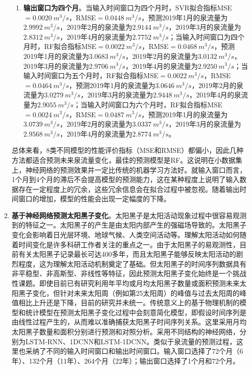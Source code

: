 \begin{enumerate}
\begin{enumerate}
      \item \textbf{输出窗口为四个月}。当输入时间窗口为四个月时，SVR拟合指标MSE$=\SI{0.0020}{m^{3}/s}$，RMSE$=\SI{0.0448}{m^{3}/s}$，预测2019年1月的泉流量为$\SI{2.9992}{m^{3}/s}$，2019年2月的泉流量为$\SI{2.9144}{m^{3}/s}$，2019年3月的泉流量为$\SI{2.8312}{m^{3}/s}$，2019年4月的泉流量为$\SI{2.7752}{m^{3}/s}$；当输入时间窗口为四个月时，RF拟合指标MSE$=\SI{0.0022}{m^{3}/s}$，RMSE$=\SI{0.0468}{m^{3}/s}$，预测2019年1月的泉流量为$\SI{3.0683}{m^{3}/s}$，2019年2月的泉流量为$\SI{3.0132}{m^{3}/s}$，2019年3月的泉流量为$\SI{2.9706}{m^{3}/s}$，2019年4月的泉流量为$\SI{2.9250}{m^{3}/s}$；当输入时间窗口为五个月时，RF拟合指标MSE$=\SI{0.0022}{m^{3}/s}$，RMSE$=\SI{0.0464}{m^{3}/s}$，预测2019年1月的泉流量为$\SI{3.0646}{m^{3}/s}$，2019年2月的泉流量为$\SI{3.0279}{m^{3}/s}$，2019年3月的泉流量为$\SI{2.9448}{m^{3}/s}$，2019年4月的泉流量为$\SI{2.9055}{m^{3}/s}$；当输入时间窗口为六个月时，RF拟合指标MSE$=\SI{0.0024}{m^{3}/s}$，RMSE$=\SI{0.0487}{m^{3}/s}$，预测2019年1月的泉流量为$\SI{3.0739}{m^{3}/s}$，2019年2月的泉流量为$\SI{3.0337}{m^{3}/s}$，2019年3月的泉流量为$\SI{2.9568}{m^{3}/s}$，2019年4月的泉流量为$\SI{2.8774}{m^{3}/s}$。
    \end{enumerate}
  
    总体来看，8类不同模型的性能评价指标（MSE和RMSE）都偏小，因此几种方法都适合预测未来泉流量变化，最佳的预测模型是RF。这说明在小数据集上，神经网络的预测效果并一定比传统的机器学习方法好。就输入窗口而言，1个月到4个月的滞后不会提高模型的预测能力，这在某种程度上说明了输入数据存在一定程度上的冗余，这些冗余信息会在拟合过程中被忽视。随着输出时间窗口的增加，模型的性能会出现一定幅度的下降。
  
  
    \item \textbf{基于神经网络预测太阳黑子变化}。太阳黑子是太阳活动现象过程中很容易观测到的特征之一。太阳黑子的产生是由太阳内部产生的强磁场导致的。太阳黑子变化会影响着日光层环境、地球气候、人类空间活动等。理解太阳活动如何随着时间变化是许多科研工作者关注的重点之一。由于太阳黑子的易观测性，目前有关太阳黑子记录最长可达400多年，而且太阳黑子能够反映太阳活动的剧烈程度，这为理解太阳活动机制奠定了基础。但太阳黑子的时间序列数据具有非平稳型、非高斯型、非线性等特征，因此预测太阳黑子变化始终是一个挑战性课题。即使目前已有研究利用年平均或月均太阳黑子数量或面积预测未来太阳黑子变化，但针对未来太阳周（例如第25太阳周）的峰值与过去太阳周的峰值相比上升还是下降，目前的研究并未统一。传统意义上的基于物理机制的模型和统计模型在预测太阳黑子变化过程中会刻意简化模型，即假设时间序列是由线性过程产生的，从而难以准确捕获太阳黑子时间序列关系。这里采用月均太阳黑子数量和面积分别进行预测和对照分析。采用不同结构的神经网络，分别为LSTM-RNN、1DCNN和LSTM-1DCNN。类似于泉流量的预测过程，这里也采纳了不同的输入时间窗口和输出时间窗口。输入窗口选择了72个月（6年）、132个月（11年）、264个月（22年）；输出窗口选择了1个月和72个月。
    

\end{enumerate}
